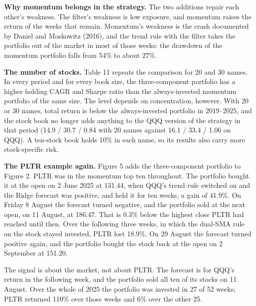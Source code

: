 \documentclass[11pt]{article}
\newcommand{\source}[1]{\par\vspace{3pt}{\footnotesize\textit{Source:} #1\par}}
\newcommand{\fittable}[1]{\sbox{\fitbox}{}%
  \ifdim\wd\fitbox>\textwidth\resizebox{\textwidth}{!}{\usebox{\fitbox}}\else\usebox{\fitbox}\fi}
\begin{document}
\textbf{Why momentum belongs in the strategy.} The two additions repair each other's weakness. The filter's weakness is low exposure, and momentum raises the return of the weeks that remain. Momentum's weakness is the crash documented by Daniel and Moskowitz (2016), and the trend rule with the filter takes the portfolio out of the market in most of those weeks: the drawdown of the momentum portfolio falls from 54\% to about 27\%.

\begin{table}[H]
\centering\small
\caption{Sensitivity to the number of stocks, annual walk-forward. Period columns give CAGR (\%) / holding CAGR (\%) / Sharpe ratio.}
\label{tab:book-size}
\fittable{tables/tab11_book_size}
\source{\texttt{results/ablation/grid.csv}}
\end{table}

\textbf{The number of stocks.} Table 11 repeats the comparison for 20 and 30 names. In every period and for every book size, the three-component portfolio has a higher holding CAGR and Sharpe ratio than the always-invested momentum portfolio of the same size. The level depends on concentration, however. With 20 or 30 names, total return is below the always-invested portfolio in 2019--2025, and the stock book no longer adds anything to the QQQ version of the strategy in that period (14.9 / 30.7 / 0.84 with 20 names against 16.1 / 33.4 / 1.06 on QQQ). A ten-stock book holds 10\% in each name, so its results also carry more stock-specific risk.

\textbf{The PLTR example again.} Figure 5 adds the three-component portfolio to Figure 2. PLTR was in the momentum top ten throughout. The portfolio bought it at the open on 2 June 2025 at 131.44, when QQQ's trend rule switched on and the Ridge forecast was positive, and held it for ten weeks, a gain of 41.9\%. On Friday 8 August the forecast turned negative, and the portfolio sold at the next open, on 11 August, at 186.47. That is 0.3\% below the highest close PLTR had reached until then. Over the following three weeks, in which the dual-SMA rule on the stock stayed invested, PLTR lost 18.9\%. On 29 August the forecast turned positive again, and the portfolio bought the stock back at the open on 2 September at 151.20.

The signal is about the market, not about PLTR. The forecast is for QQQ's return in the following week, and the portfolio sold all ten of its stocks on 11 August. Over the whole of 2025 the portfolio was invested in 27 of 52 weeks; PLTR returned 110\% over those weeks and 6\% over the other 25.
\end{document}
